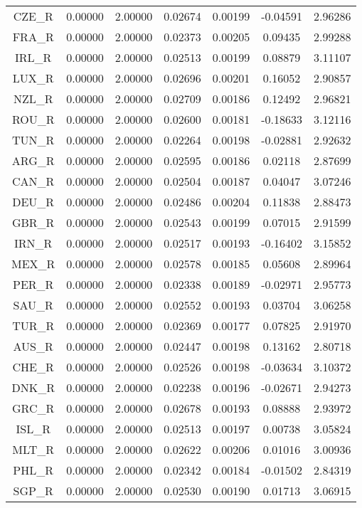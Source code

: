 \begin{longtable}{c c c c c c c}
CZE_R & 0.00000 & 2.00000 & 0.02674 & 0.00199 & -0.04591 & 2.96286 \\
FRA_R & 0.00000 & 2.00000 & 0.02373 & 0.00205 & 0.09435 & 2.99288 \\
IRL_R & 0.00000 & 2.00000 & 0.02513 & 0.00199 & 0.08879 & 3.11107 \\
LUX_R & 0.00000 & 2.00000 & 0.02696 & 0.00201 & 0.16052 & 2.90857 \\
NZL_R & 0.00000 & 2.00000 & 0.02709 & 0.00186 & 0.12492 & 2.96821 \\
ROU_R & 0.00000 & 2.00000 & 0.02600 & 0.00181 & -0.18633 & 3.12116 \\
TUN_R & 0.00000 & 2.00000 & 0.02264 & 0.00198 & -0.02881 & 2.92632 \\
ARG_R & 0.00000 & 2.00000 & 0.02595 & 0.00186 & 0.02118 & 2.87699 \\
CAN_R & 0.00000 & 2.00000 & 0.02504 & 0.00187 & 0.04047 & 3.07246 \\
DEU_R & 0.00000 & 2.00000 & 0.02486 & 0.00204 & 0.11838 & 2.88473 \\
GBR_R & 0.00000 & 2.00000 & 0.02543 & 0.00199 & 0.07015 & 2.91599 \\
IRN_R & 0.00000 & 2.00000 & 0.02517 & 0.00193 & -0.16402 & 3.15852 \\
MEX_R & 0.00000 & 2.00000 & 0.02578 & 0.00185 & 0.05608 & 2.89964 \\
PER_R & 0.00000 & 2.00000 & 0.02338 & 0.00189 & -0.02971 & 2.95773 \\
SAU_R & 0.00000 & 2.00000 & 0.02552 & 0.00193 & 0.03704 & 3.06258 \\
TUR_R & 0.00000 & 2.00000 & 0.02369 & 0.00177 & 0.07825 & 2.91970 \\
AUS_R & 0.00000 & 2.00000 & 0.02447 & 0.00198 & 0.13162 & 2.80718 \\
CHE_R & 0.00000 & 2.00000 & 0.02526 & 0.00198 & -0.03634 & 3.10372 \\
DNK_R & 0.00000 & 2.00000 & 0.02238 & 0.00196 & -0.02671 & 2.94273 \\
GRC_R & 0.00000 & 2.00000 & 0.02678 & 0.00193 & 0.08888 & 2.93972 \\
ISL_R & 0.00000 & 2.00000 & 0.02513 & 0.00197 & 0.00738 & 3.05824 \\
MLT_R & 0.00000 & 2.00000 & 0.02622 & 0.00206 & 0.01016 & 3.00936 \\
PHL_R & 0.00000 & 2.00000 & 0.02342 & 0.00184 & -0.01502 & 2.84319 \\
SGP_R & 0.00000 & 2.00000 & 0.02530 & 0.00190 & 0.01713 & 3.06915 \\

\end{longtable}
